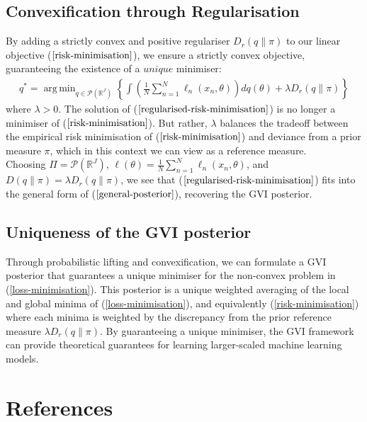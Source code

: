 \documentclass[twoside,11pt]{article}
\DeclareMathOperator*{\argmin}{arg\,min}
\begin{document}
\subsection{Convexification through Regularisation}
By adding a strictly convex and positive regulariser $D_r(q\| \pi)$ to our linear objective ($\ref{risk-minimisation}$), we ensure a strictly convex objective, guaranteeing the existence of a $\textit{unique}$ minimiser:
\begin{align}
    q^* = \argmin_{q \in \mathcal{P}(\mathbb{R}^J)} \left\{\int \left( \frac{1}{N}\sum_{n=1}^N\ell_n(x_n, \theta)\right) dq(\theta) + \lambda D_r(q \| \pi)\right\}
\label{regularised-risk-minimisation}
\end{align}
where $\lambda > 0$. The solution of ($\ref{regularised-risk-minimisation}$) is no longer a minimiser of ($\ref{risk-minimisation}$). But rather, $\lambda$ balances the tradeoff between the empirical risk minimisation of ($\ref{risk-minimisation}$) and deviance from a prior measure $\pi$, which in this context we can view as a reference measure.\\
\newline 
Choosing $\Pi =\mathcal{P}(\mathbb{R}^J)$, $\ell(\theta) = \frac{1}{N}\sum_{n=1}^N\ell_n(x_n, \theta)$, and $D(q\| \pi) = \lambda D_r(q\| \pi)$, we see that ($\ref{regularised-risk-minimisation}$) fits into the general form of ($\ref{general-posterior}$), recovering the GVI posterior. 
\subsection{Uniqueness of the GVI posterior}
Through probabilistic lifting and convexification, we can formulate a GVI posterior that guarantees a unique minimiser for the non-convex problem in (\ref{loss-minimisation}). This posterior is a unique weighted averaging of the local and global minima of (\ref{loss-minimisation}), and equivalently (\ref{risk-minimisation}) where each minima is weighted by the discrepancy from the prior reference measure $\lambda D_r(q \| \pi)$. By guaranteeing a unique minimiser, the GVI framework can provide theoretical guarantees for learning larger-scaled machine learning models.

\begingroup
\let\clearpage\relax
\AtNextBibliography{\small}
\section*{References}
\printbibliography[heading=talikarng, title = {References}]
\endgroup
\end{document}
